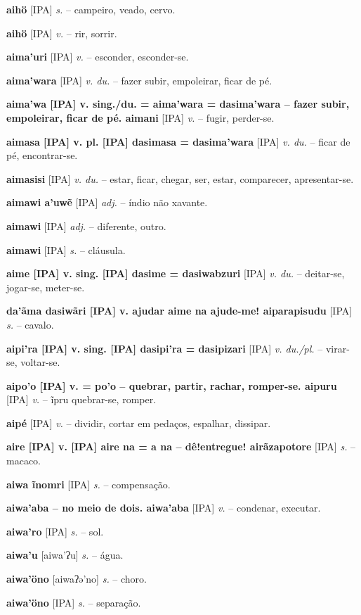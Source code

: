 \textbf{aihö} [IPA] \textit{s.} -- campeiro, veado, cervo.

\textbf{aihö} [IPA] \textit{v.} -- rir, sorrir.

\textbf{aima'uri} [IPA] \textit{v.} -- esconder, esconder-se.

\textbf{aima'wara} [IPA] \textit{v. du.} -- fazer subir, empoleirar, ficar de pé.

\textbf{aima'wa [IPA] v. sing./du. = aima'wara = dasima'wara -- fazer subir, empoleirar, ficar de pé. aimani} [IPA] \textit{v.} -- fugir, perder-se.

\textbf{aimasa [IPA] v. pl. [IPA] dasimasa = dasima'wara} [IPA] \textit{v. du.} -- ficar de pé, encontrar-se.

\textbf{aimasisi} [IPA] \textit{v. du.} -- estar, ficar, chegar, ser, estar, comparecer, apresentar-se.

\textbf{aimawi a'uwẽ} [IPA] \textit{adj.} -- índio não xavante.

\textbf{aimawi} [IPA] \textit{adj.} -- diferente, outro.

\textbf{aimawi} [IPA] \textit{s.} -- cláusula.

\textbf{aime [IPA] v. sing. [IPA] dasime = dasiwabzuri} [IPA] \textit{v. du.} -- deitar-se, jogar-se, meter-se.

\textbf{da'ãma dasiwãri [IPA] v. ajudar  aime na ajude-me! aiparapisudu} [IPA] \textit{s.} -- cavalo.

\textbf{aipi'ra [IPA] v. sing. [IPA] dasipi'ra = dasipizari} [IPA] \textit{v. du./pl.} -- virar-se, voltar-se.

\textbf{aipo'o [IPA] v. = po'o -- quebrar, partir, rachar, romper-se. aipuru} [IPA] \textit{v.} -- ĩpru quebrar-se, romper.

\textbf{aipé} [IPA] \textit{v.} -- dividir, cortar em pedaços, espalhar, dissipar.

\textbf{aire [IPA] v. [IPA] aire na = a na -- dê!entregue! airãzapotore} [IPA] \textit{s.} -- macaco.

\textbf{aiwa ĩnomri} [IPA] \textit{s.} -- compensação.

\textbf{aiwa'aba -- no meio de dois. aiwa'aba} [IPA] \textit{v.} -- condenar, executar.

\textbf{aiwa'ro} [IPA] \textit{s.} -- sol.

\textbf{aiwa'u} [aiwa'ʔu] \textit{s.} -- água.

\textbf{aiwa'öno} [aiwaʔə'no] \textit{s.} -- choro.

\textbf{aiwa'öno} [IPA] \textit{s.} -- separação.

